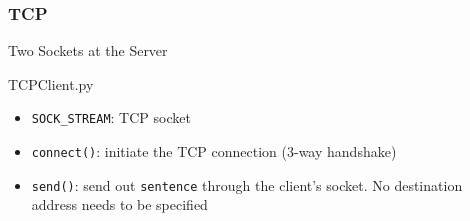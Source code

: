 \subsubsection{TCP}

\begin{frame}
  \begin{iblock}{Two Sockets at the Server}
    \begin{center}
    \end{center}
  \end{iblock}
\end{frame}

\begin{frame}{TCPClient.py}
  \begin{center}
  \end{center}
  \begin{itemize}
  \item \texttt{SOCK\_STREAM}: TCP socket
  \item \texttt{connect()}: initiate the TCP connection (3-way handshake)
  \item \texttt{send()}: send out \texttt{sentence} through the client's socket. No
    destination address needs to be specified
  \end{itemize}
\end{frame}

